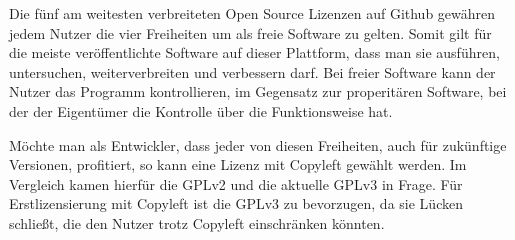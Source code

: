 
Die fünf am weitesten verbreiteten Open Source Lizenzen auf Github gew\"ahren jedem Nutzer die vier Freiheiten um als freie Software zu gelten. Somit gilt f\"ur die meiste ver\"offentlichte Software auf dieser Plattform, dass man sie ausf\"uhren, untersuchen, weiterverbreiten und verbessern darf. Bei freier Software kann der Nutzer das Programm kontrollieren, im Gegensatz zur properit\"aren Software, bei der der Eigentümer die Kontrolle \"uber die Funktionsweise hat. 

Möchte man als Entwickler, dass jeder von diesen Freiheiten, auch f\"ur zuk\"unftige Versionen, profitiert, so kann eine Lizenz mit Copyleft gew\"ahlt werden. Im Vergleich kamen hierf\"ur die GPLv2 und die aktuelle GPLv3 in Frage. F\"ur Erstlizensierung mit Copyleft ist die GPLv3 zu bevorzugen, da sie L\"ucken schließt, die den Nutzer trotz Copyleft einschr\"anken k\"onnten. 